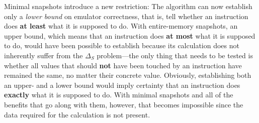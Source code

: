 Minimal snapshots introduce a new restriction: The algorithm can now establish only a \textit{lower bound} on emulator
correctness, that is, tell whether an instruction does \textbf{at least} what it is supposed to do. With entire-memory
snapshots, an upper bound, which means that an instruction does \textbf{at most} what it is supposed to do, would have
been possible to establish because its calculation does not inherently suffer from the $\Delta_S$ problem---the only
thing that needs to be tested is whether all values that should \textbf{not} have been touched by an instruction have
remained the same, no matter their concrete value. Obviously, establishing both an upper- and a lower bound would imply
certainty that an instruction does \textbf{exactly} what it is supposed to do. With minimal snapshots and all of the
benefits that go along with them, however, that becomes impossible since the data required for the calculation is not
present.



%
%
%
